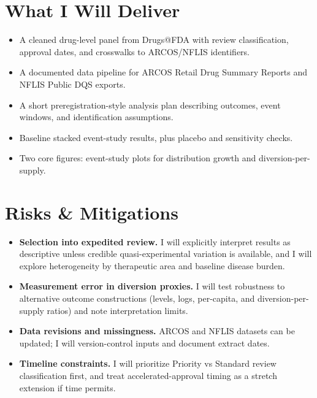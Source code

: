 \documentclass[11pt]{article}
\begin{document}
\section*{What I Will Deliver}
\begin{itemize}
  \item A cleaned drug-level panel from Drugs@FDA with review classification, approval dates, and crosswalks to ARCOS/NFLIS identifiers.
  \item A documented data pipeline for ARCOS Retail Drug Summary Reports and NFLIS Public DQS exports.
  \item A short preregistration-style analysis plan describing outcomes, event windows, and identification assumptions.
  \item Baseline stacked event-study results, plus placebo and sensitivity checks.
  \item Two core figures: event-study plots for distribution growth and diversion-per-supply.
\end{itemize}

\section*{Risks \& Mitigations}
\begin{itemize}
  \item \textbf{Selection into expedited review.} I will explicitly interpret results as descriptive unless credible quasi-experimental variation is available, and I will explore heterogeneity by therapeutic area and baseline disease burden.
  \item \textbf{Measurement error in diversion proxies.} I will test robustness to alternative outcome constructions (levels, logs, per-capita, and diversion-per-supply ratios) and note interpretation limits.
  \item \textbf{Data revisions and missingness.} ARCOS and NFLIS datasets can be updated; I will version-control inputs and document extract dates.
  \item \textbf{Timeline constraints.} I will prioritize Priority vs Standard review classification first, and treat accelerated-approval timing as a stretch extension if time permits.
\end{itemize}

\printbibliography
\end{document}
